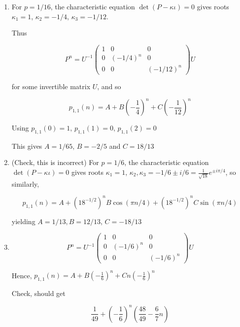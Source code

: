 \documentclass[a4paper]{article}
\begin{document}
\begin{enumerate}[label = (\alph*)]
	\item For $ p = 1/16 $, the characteristic equation $ \det(P - \kappa \iota) = 0 $  gives roots $ \kappa_{1} = 1 $, $ \kappa_{2} = - 1/4 $, $ \kappa_{3} = - 1/12 $.
	
	Thus
	
	\[ P^{n} = U^{-1}  \begin{pmatrix}
	1 & 0 & 0 \\
	0 & (-1/4)^{n} & 0 \\
	0 & 0 & (- 1/12)^{n} 
	\end{pmatrix} U  \]
	
	for some invertible matrix $ U $, and so 
	
	\[ p_{1,1}(n) = A + B\left(  - \frac{1}{4} \right)^{n} + C \left(  - \frac{1}{12} \right)^{n}  \]
	
	Using $ p_{1,1}(0) = 1 $, $ p_{1,1}(1) = 0 $, $ p_{1,1}(2) = 0 $
	
	This gives $ A = 1/65 $, $ B = - 2/5 $ and $ C = 18/13 $
	
	\item (Check, this is incorrect)  For $ p = 1/6 $, the characteristic equation $ \det(P - \kappa \iota) = 0 $  gives roots $ \kappa_{1} = 1 $, $ \kappa_{2}, \kappa_{3} = -1/6 \pm i/6 = \frac{1}{\sqrt{18}} e^{\pm i \pi / 4} $, so similarly,
	
	\[ p_{1,1}(n) = A + \left(  18^{-1/2} \right)^{n} B \cos ( \pi n / 4) + \left(  18^{-1/2} \right)^{n} C \sin ( \pi n / 4)    \]
	
	yielding $ A = 1/13,  B = 12/13 $, $ C = - 18/13 $
	
	\item 		\[ P^{n} = U^{-1}  \begin{pmatrix}
	1 & 0 & 0 \\
	0 & (-1/6)^{n} & 0 \\
	0 & 0 & (- 1/6)^{n} 
	\end{pmatrix} U  \]
	
	Hence, $ p_{1,1}(n) = A + B \left(  - \frac{1}{6} \right)^{n} + C n \left(  - \frac{1}{6} \right)^{n}     $
	
	Check, should get
	
	\[ \frac{1}{49} + \left(  - \frac{1}{6} \right)^{n} \left(  \frac{48}{49}  - \frac{6}{7} n  \right)    \]
	

	
	
 	
	
\end{enumerate}
\end{document}
